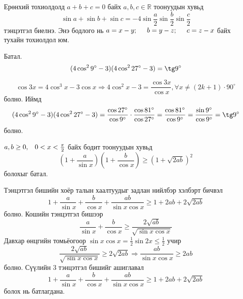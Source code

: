\documentclass[10pt,a4paper,oneside]{book}
\begin{document}
\Note
Ерөнхий тохиолдолд $a+b+c=0$ байх $a, b, c \in \mathbb{R}$ тоонуудын хувьд
\begin{equation*}
\sin a + \sin b + \sin c = -4\sin\frac{a}{2}\sin\frac{b}{2}\sin\frac{c}{2}
\end{equation*}
тэнцэтгэл биелнэ. Энэ бодлого нь $a=x-y;\hspace{0.5cm} b=y-z;\hspace{0.5cm} c=z-x$ байх тухайн тохиолдол юм.

\Problem
Батал.
\begin{equation*}
(4\cos^2 9^\circ-3)(4\cos^2 27^\circ - 3) = \tg 9^\circ
\end{equation*}

\TheSolution
\begin{equation*}
\cos 3x = 4\cos^3 x - 3\cos x \Rightarrow 4\cos^2 x - 3 = \frac{\cos 3x}{\cos x}, \forall x \neq(2k+1)\cdot 90^\circ
\end{equation*}
болно. Иймд
\begin{equation*}
(4\cos^2 9^\circ - 3)(4\cos^2 27^\circ - 3) = \frac{\cos 27^\circ}{\cos 9^\circ}\cdot\frac{\cos 81^\circ}{\cos 27^\circ}
=\frac{\cos 81^\circ}{\cos 9^\circ}=\frac{\sin 9^\circ}{\cos 9^\circ} = \tg 9^\circ
\end{equation*}
болно.

\Problem
$a, b \geq 0,\hspace{0.3cm} 0<x<\frac{\pi}{2}$ байх бодит тоонуудын хувьд
\begin{equation*}
\left(1+\frac{a}{\sin x}\right)\left(1+\frac{b}{\cos x}\right)\geq \left(1+\sqrt{2ab}\right)^2
\end{equation*}
болохыг батал.

\TheSolution
Тэнцэтгэл бишийн хоёр талын хаалтуудыг задлан нийлбэр хэлбэрт бичвэл
\begin{equation*}
1+\frac{a}{\sin x} + \frac{b}{\cos x}+\frac{ab}{\sin x \cos x} \geq 1 + 2ab + 2\sqrt{2ab}
\end{equation*}
болно.
Кошийн тэнцэтгэл бишээр
\begin{equation*}
\frac{a}{\sin x}+\frac{b}{\cos x} \geq \frac{2\sqrt{ab}}{\sqrt{\sin x\cos x}}
\end{equation*}
Давхар өнцгийн томьёогоор $\sin x\cos x = \frac{1}{2}\sin 2x \leq \frac{1}{2}$ учир
\begin{equation*}
\frac{2\sqrt{ab}}{\sqrt{\sin x\cos x}} \geq 2\sqrt{2ab} \Rightarrow \frac{ab}{\sin x \cos x} \geq 2ab
\end{equation*}
болно. Сүүлийн 3 тэнцэтгэл бишийг ашиглавал
\begin{equation*}
1+\frac{a}{\sin x} + \frac{b}{\cos x}+\frac{ab}{\sin x \cos x} \geq 1 + 2ab + 2\sqrt{2ab}
\end{equation*}
болох нь батлагдана.
\end{document}

